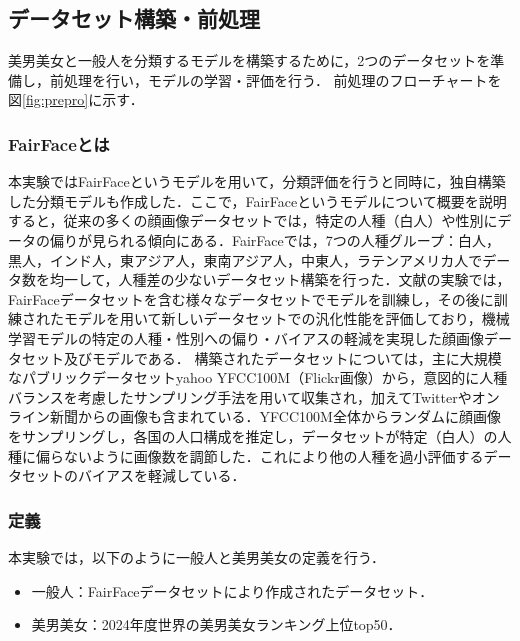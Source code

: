 \documentclass[a4paper,11pt,titlepage]{jsarticle}
\begin{document}
\subsection{データセット構築・前処理}
美男美女と一般人を分類するモデルを構築するために，2つのデータセットを準備し，前処理を行い，モデルの学習・評価を行う．
前処理のフローチャートを図\ref{fig:prepro}に示す．


\subsubsection{FairFaceとは}
本実験ではFairFaceというモデルを用いて，分類評価を行うと同時に，独自構築した分類モデルも作成した．ここで，FairFaceというモデルについて概要を説明すると，従来の多くの顔画像データセットでは，特定の人種（白人）や性別にデータの偏りが見られる傾向にある．FairFaceでは，7つの人種グループ：白人，黒人，インド人，東アジア人，東南アジア人，中東人，ラテンアメリカ人でデータ数を均一して，人種差の少ないデータセット構築を行った\cite{karkkainenFairFace}．文献\cite{karkkainenFairFace}の実験では，FairFaceデータセットを含む様々なデータセットでモデルを訓練し，その後に訓練されたモデルを用いて新しいデータセットでの汎化性能を評価しており，機械学習モデルの特定の人種・性別への偏り・バイアスの軽減を実現した顔画像データセット及びモデルである．
構築されたデータセットについては，主に大規模なパブリックデータセットyahoo YFCC100M（Flickr画像）から，意図的に人種バランスを考慮したサンプリング手法を用いて収集され，加えてTwitterやオンライン新聞からの画像も含まれている．YFCC100M全体からランダムに顔画像をサンプリングし，各国の人口構成を推定し，データセットが特定（白人）の人種に偏らないように画像数を調節した．これにより他の人種を過小評価するデータセットのバイアスを軽減している．




\subsubsection{定義}
本実験では，以下のように一般人と美男美女の定義を行う．
\begin{itemize}
    \item 一般人：FairFaceデータセットにより作成されたデータセット．
    \item 美男美女：2024年度世界の美男美女ランキング上位top50．
\end{itemize}
\end{document}

